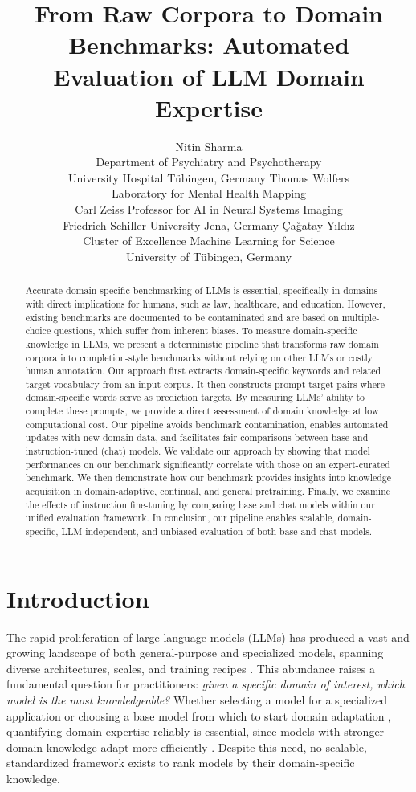 \documentclass[10pt]{article}
\title{From Raw Corpora to Domain Benchmarks: Automated Evaluation of LLM Domain Expertise}
\author{\name Nitin Sharma \\
      \addr Department of Psychiatry and Psychotherapy\\
      University Hospital Tübingen, Germany
      \AND
      \name Thomas Wolfers \\
      \addr Laboratory for Mental Health Mapping \\ Carl Zeiss Professor for AI in Neural Systems Imaging\\
      Friedrich Schiller University Jena, Germany
      \AND
      \name Çağatay Yıldız \\
      \addr Cluster of Excellence Machine Learning for Science\\
      University of Tübingen, Germany}
\begin{document}
\maketitle


\begin{abstract}
    
Accurate domain-specific benchmarking of LLMs is essential, specifically in domains with direct implications for humans, such as law, healthcare, and education. However, existing benchmarks are documented to be contaminated and are based on multiple-choice questions, which suffer from inherent biases. To measure domain-specific knowledge in LLMs, we present a deterministic pipeline that transforms raw domain corpora into completion-style benchmarks without relying on other LLMs or costly human annotation. Our approach first extracts domain-specific keywords and related target vocabulary from an input corpus. It then constructs prompt-target pairs where domain-specific words serve as prediction targets. By measuring LLMs' ability to complete these prompts, we provide a direct assessment of domain knowledge at low computational cost. Our pipeline avoids benchmark contamination, enables automated updates with new domain data, and facilitates fair comparisons between base and instruction-tuned (chat) models. We validate our approach by showing that model performances on our benchmark significantly correlate with those on an expert-curated benchmark. We then demonstrate how our benchmark provides insights into knowledge acquisition in domain-adaptive, continual, and general pretraining. Finally, we examine the effects of instruction fine-tuning by comparing base and chat models within our unified evaluation framework. In conclusion, our pipeline enables scalable, domain-specific, LLM-independent, and unbiased evaluation of both base and chat models.
\end{abstract}

\section{Introduction} \vspace*{-.25cm}
The rapid proliferation of large language models (LLMs) has produced a vast and growing landscape of both general-purpose and specialized models, spanning diverse architectures, scales, and training recipes \citep{chiang2024chatbot}. This abundance raises a fundamental question for practitioners: \emph{given a specific domain of interest, which model is the most knowledgeable?} Whether selecting a model for a specialized application or choosing a base model from which to start domain adaptation \citep{han2023medalpaca, colombo2024saullm, singhal2025toward, liu2023fingpt}, quantifying domain expertise reliably is essential, since models with stronger domain knowledge adapt more efficiently \citep{gururangan2020don}. Despite this need, no scalable, standardized framework exists to rank models by their domain-specific knowledge.
\end{document}
